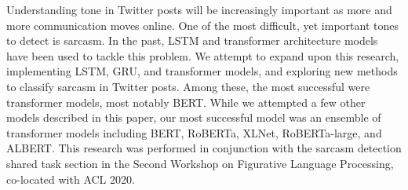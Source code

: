 Understanding tone in Twitter posts will be increasingly important as more and more communication moves online. One of the most difficult, yet important tones to detect is sarcasm. In the past, LSTM and transformer architecture models have been used to tackle this problem. We attempt to expand upon this research, implementing LSTM, GRU, and transformer models, and exploring new methods to classify sarcasm in Twitter posts. Among these, the most successful were transformer models, most notably BERT. While we attempted a few other models described in this paper, our most successful model was an ensemble of transformer models including BERT, RoBERTa, XLNet, RoBERTa-large, and ALBERT. This research was performed in conjunction with the sarcasm detection shared task section in the Second Workshop on Figurative Language Processing, co-located with ACL 2020.
